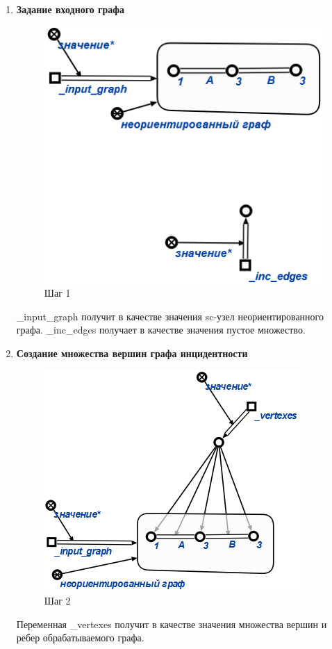 \begin{enumerate}

\item
\textbf{Задание входного графа}
\begin{figure}[H]
  \centering
  \includegraphics[scale=0.7]{algo/1.png}
  \caption{Шаг 1}
\end{figure}
\_input\_graph получит в качестве значения sc-узел неориентированного графа.
\_inc\_edges получает в качестве значения пустое множество.

\item
\textbf{ Создание множества вершин графа инцидентности}
\begin{figure}[H]
  \centering
  \includegraphics[scale=0.7]{algo/2.png}
  \caption{Шаг 2}
\end{figure}
Переменная \_vertexes получит в качестве значения множества вершин и ребер обрабатываемого графа.


\end{enumerate}
